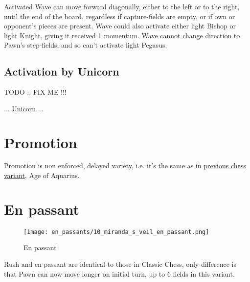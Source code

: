 Activated Wave can move forward diagonally, either to the left or to the right, until the 
end of the board, regardless if capture-fields are empty, or if own or opponent's pieces are 
present. Wave could also activate either light Bishop or light Knight, giving it received 1 
momentum. Wave cannot change direction to Pawn's step-fields, and so can't activate light 
Pegasus.

\clearpage %

\subsection*{Activation by Unicorn}

\huge{TODO :: FIX ME !!!}
\normalsize{}

... Unicorn ...

\clearpage %

\section*{Promotion}

Promotion is non enforced, delayed variety, i.e. it's the same as in
\hyperref[sec:Age of Aquarius/Promotion]{previous chess variant}, Age of Aquarius.

\clearpage %

\section*{En passant}

\noindent
\begin{wrapfigure}{l}{0.4\textwidth}
\centering
\texttt{[image: en\_passants/10\_miranda\_s\_veil\_en\_passant.png]}
\caption{En passant}
\label{fig:10_miranda_s_veil_en_passant}
\end{wrapfigure}
Rush and en passant are identical to those in Classic Chess, only difference
is that Pawn can now move longer on initial turn, up to 6 fields in this
variant.

\clearpage %

